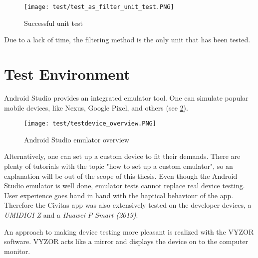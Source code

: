 \begin{figure}[H]
    \centering \texttt{[image: test/test\_as\_filter\_unit\_test.PNG]}
    \caption[Successful unit test]{Successful unit test}
    \label{fig:test_as_filter_unit_test}
\end{figure}

Due to a lack of time, the filtering method is the only unit that has been tested.

\section{Test Environment}
Android Studio provides an integrated emulator tool. One can simulate popular mobile devices, like Nexus, Google Pixel, and others (see \ref{fig:testdevice_overview}).

\begin{figure}[H]
    \centering \texttt{[image: test/testdevice\_overview.PNG]}
    \caption[Android Studio emulator overview]{Android Studio emulator overview}
    \label{fig:testdevice_overview}
\end{figure}

Alternatively, one can set up a custom device to fit their demands. There are plenty of tutorials with the topic "how to set up a custom emulator", so an explanation will be out of the scope of this thesis. 
Even though the Android Studio emulator is well done, emulator tests cannot replace real device testing.
User experience goes hand in hand with the haptical behaviour of the app. Therefore the Civitas app was also extensively tested on the developer devices, a \textit{UMIDIGI Z} and a \textit{Huawei P Smart (2019)}. 

An approach to making device testing more pleasant is realized with the VYZOR software. VYZOR acts like a mirror and displays the device on to the computer monitor.  




